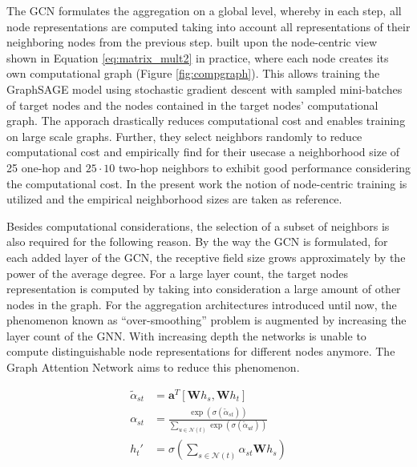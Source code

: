 The GCN formulates the aggregation on a global level, whereby in each step, all node representations are computed taking into account all representations of their neighboring nodes from the previous step. \textcite{hamilton2017inductive} built upon the node-centric view shown in Equation \eqref{eq:matrix_mult2} in practice,  where each node creates its own computational graph (Figure \ref{fig:compgraph}). This allows training the GraphSAGE model using stochastic gradient descent with sampled mini-batches of target nodes and the nodes contained in the target nodes' computational graph. The apporach drastically reduces computational cost and enables training on large scale graphs. Further, they select neighbors randomly to reduce computational cost and empirically find for their usecase a neighborhood size of 25 one-hop and $25\cdot10$ two-hop neighbors to exhibit good performance considering the computational cost. In the present work the notion of node-centric training is utilized and the empirical neighborhood sizes are taken as reference.

Besides computational considerations, the selection of a subset of neighbors is also required for the following reason. By the way the GCN is formulated, for each added layer of the GCN, the receptive field size grows approximately by the power of the average degree. For a large layer count, the target nodes representation is computed by taking into consideration a large amount of other nodes in the graph. For the aggregation architectures introduced until now, the phenomenon known as “over-smoothing” problem \parencite{rusch2023survey} is augmented by increasing the layer count of the GNN. With increasing depth the networks is unable to compute distinguishable node representations for different nodes anymore. The Graph Attention Network aims to reduce this phenomenon.



\begin{equation}
\begin{aligned}
\tilde{\alpha}_{st} &= \mathbf{a}^T [\mathbf{W}h_{s}, \mathbf{W}h_{t}] \\
\alpha_{st} &= \frac{\exp\left(\sigma(\tilde{\alpha}_{st})\right)}{\sum_{u \in \mathcal{N}(t)} \exp\left(\sigma(\tilde{\alpha}_{ut})\right)} \\
h_t' &= \sigma\left(\sum_{s\in \mathcal{N}(t)} \alpha_{st}\mathbf{W}h_{s}\right)
\label{eq:gat}
\end{aligned}
\end{equation}




